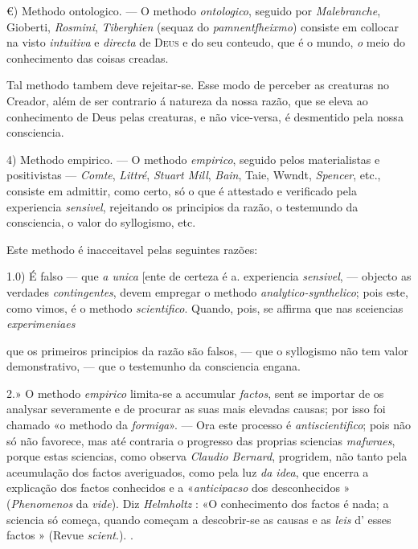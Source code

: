 €) Methodo ontologico. --- O methodo \emph{ontologico}, seguido por \emph{Malebranche}, Gioberti, \emph{Rosmini}, \emph{Tiberghien} (sequaz do \emph{pamnentfheixmo}) consiste em collocar na visto \emph{intuitiva} e \emph{directa} de \textsc{Deus} e do seu conteudo, que é o mundo, \emph{o} meio do conhecimento das coisas creadas.

Tal methodo tambem deve rejeitar-se. Esse modo de perceber as creaturas no Creador, além de ser contrario á natureza da nossa razão, que se eleva ao conhecimento de Deus pelas creaturas, e não vice-versa, é desmentido pela nossa consciencia.

4) Methodo empirico. --- O methodo \emph{empirico}, seguido pelos materialistas e positivistas --- \emph{Comte}, \emph{Littré}, \emph{Stuart Mill}, \emph{Bain}, Taie, Wwndt, \emph{Spencer}, etc., consiste em admittir, como certo, só o que é attestado e verificado pela experiencia \emph{sensivel}, rejeitando os principios da razão, o testemundo da consciencia, o valor do syllogismo, etc.

Este methodo é inacceitavel pelas seguintes razões:

1.0) É falso --- que \emph{a unica} [ente de certeza é a. experiencia \emph{sensivel}, ---   objecto as verdades \emph{contingentes}, devem empregar o methodo \emph{analytico-synthelico}; pois este, como vimos, é o methodo \emph{scientifico}. Quando, pois, se affirma que nas sceiencias \emph{experimeniaes}

que os primeiros principios da razão são falsos, --- que o syllogismo não tem valor demonstrativo, --- que o testemunho da consciencia engana.

2.» O methodo \emph{empirico} limita-se a accumular \emph{factos}, sent se importar de os analysar severamente e de procurar as suas mais elevadas causas; por isso foi chamado «o methodo da \emph{formiga}». --- Ora este processo é \emph{antiscientifico}; pois não só não favorece, mas até contraria o progresso das proprias sciencias \emph{mafwraes}, porque estas sciencias, como observa \emph{Claudio Bernard}, progridem, não tanto pela aceumulação dos factos averiguados, como pela luz \emph{da idea}, que encerra a explicação dos factos conhecidos e a «\emph{anticipacso} dos desconhecidos » (\emph{Phenomenos} da \emph{vide}). Diz \emph{Helmholtz} : «O conhecimento dos factos é nada; a sciencia só começa, quando começam a descobrir-se as causas e as \emph{leis} d' esses factos » (Revue \emph{scient}.). .

